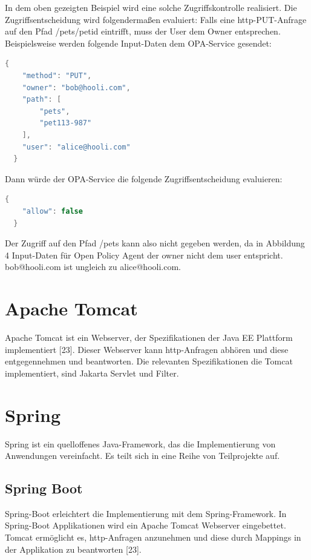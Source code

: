 In dem oben gezeigten Beispiel wird eine solche Zugriffskontrolle realisiert. Die 
Zugriffsentscheidung wird folgendermaßen evaluiert:
Falls eine http-PUT-Anfrage auf den Pfad /pets/{petid} eintrifft, muss der User dem 
Owner entsprechen. Beispielsweise werden folgende Input-Daten dem OPA-Service gesendet:

\begin{lstlisting}[language=C++,frame=tb,caption={Zugriffsrichtlinie in Rego},label=lst:ZugriffsrichtlinieinRego]
  {
    "method": "PUT",
    "owner": "bob@hooli.com",
    "path": [
        "pets",
        "pet113-987"
    ],
    "user": "alice@hooli.com"
  }
\end{lstlisting}

Dann würde der OPA-Service die folgende Zugriffsentscheidung evaluieren:

\begin{lstlisting}[language=C++,frame=tb,caption={Zugriffsrichtlinie in Rego},label=lst:ZugriffsrichtlinieinRego]
  {
    "allow": false
  }
\end{lstlisting}

Der Zugriff auf den Pfad /pets kann also nicht gegeben werden, da in Abbildung 4 Input-Daten für Open Policy Agent der owner nicht dem user entspricht. bob@hooli.com ist ungleich zu alice@hooli.com. 

\section{Apache Tomcat}
Apache Tomcat ist ein Webserver, der Spezifikationen der Java EE Plattform implementiert
[23]. Dieser Webserver kann http-Anfragen abhören und diese entgegennehmen und 
beantworten. Die relevanten Spezifikationen die Tomcat implementiert, sind Jakarta Servlet
und Filter. 

\section{Spring}
Spring ist ein quelloffenes Java-Framework, das die Implementierung von Anwendungen 
vereinfacht. Es teilt sich in eine Reihe von Teilprojekte auf. 

\subsection{Spring Boot}
Spring-Boot erleichtert die Implementierung mit dem Spring-Framework. In Spring-Boot Applikationen wird ein Apache Tomcat Webserver eingebettet. Tomcat ermöglicht es, http-Anfragen anzunehmen und diese durch Mappings in der Applikation zu beantworten [23].

